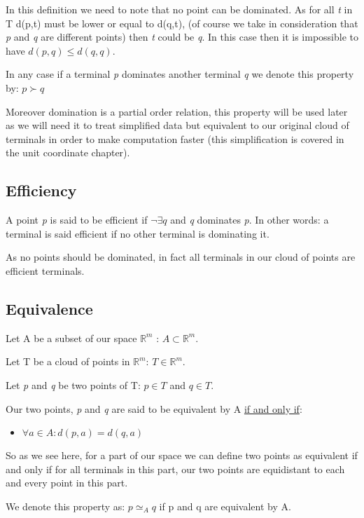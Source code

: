 In this definition we need to note that no point can be dominated. As for all \emph{t} in T d(p,t) must be lower or equal to d(q,t), (of course we take in consideration that \emph{p} and \emph{q} are different points) then \emph{t} could be \emph{q}. In this case then it is impossible to have $d(p,q)\leq d(q,q)$.

In any case if a terminal \emph{p} dominates another terminal \emph{q} we denote this property by: $ p \succ q $\newline

Moreover domination is a partial order relation, this property will be used later as we will need it to treat simplified data but equivalent to our original cloud of terminals in order to make computation faster (this simplification is covered in the unit coordinate chapter).
\subsection{Efficiency}%
A point \emph{p} is said to be efficient if $\neg\exists q$ and \emph{q} dominates \emph{p}. In other words: a terminal is said efficient if no other terminal is dominating it.

As no points should be dominated, in fact all terminals in our cloud of points are efficient terminals.
\subsection{Equivalence} %
Let A be a subset of  our space $\mathbb{R}^m$ : $A \subset \mathbb{R}^m$.

Let T be a cloud of points in $\mathbb{R}^m$: $T \in \mathbb{R}^m$.

Let \emph{p} and \emph{q} be two points of T: $p \in T$ and $q \in T$.

\noindent Our two points, \emph{p} and \emph{q} are said to be equivalent by A \underline{if and only if}:
\begin{itemize}[noitemsep, nolistsep]
	\item{$\forall a \in A : d(p,a) = d(q,a)$}
\end{itemize} 

So as we see here, for a part of our space we can define two points as equivalent if and only if for all terminals in this part, our two points are equidistant to each and every point in this part.

We denote this property as: $p \simeq_{A} q$ if p and q are equivalent by A.

